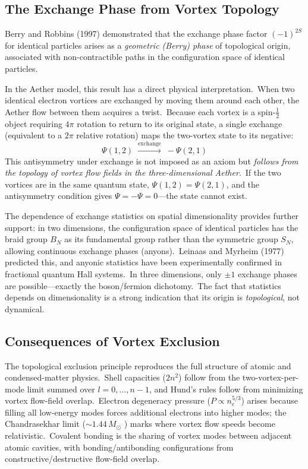 ﻿\documentclass[12pt,letterpaper]{article}
\begin{document}
\subsection{The Exchange Phase from Vortex Topology}

Berry and Robbins (1997) \cite{berry1997} demonstrated that the exchange phase
factor $(-1)^{2S}$ for identical particles arises as a \emph{geometric
(Berry) phase} of topological origin, associated with non-contractible paths in
the configuration space of identical particles.

In the Aether model, this result has a direct physical interpretation.\ When two
identical electron vortices are exchanged by moving them around each other, the
Aether flow between them acquires a twist.\ Because each vortex is a
spin-$\tfrac{1}{2}$ object requiring $4\pi$ rotation to return to its original
state, a single exchange (equivalent to a $2\pi$ relative rotation) maps the
two-vortex state to its negative:
%
\begin{equation}
  \Psi(1,2) \;\xrightarrow{\text{exchange}}\; -\Psi(2,1)
\end{equation}
%
This antisymmetry under exchange is not imposed as an axiom but \emph{follows
from the topology of vortex flow fields in the three-dimensional Aether}.\ If
the two vortices are in the same quantum state, $\Psi(1,2) = \Psi(2,1)$, and
the antisymmetry condition gives $\Psi = -\Psi = 0$---the state cannot exist.

The dependence of exchange statistics on spatial dimensionality provides further
support: in two dimensions, the configuration space of identical particles has the
braid group $B_N$ as its fundamental group rather than the symmetric group $S_N$,
allowing continuous exchange phases (anyons).\ Leinaas and Myrheim (1977)
\cite{leinaas1977} predicted this, and anyonic statistics have been experimentally
confirmed in fractional quantum Hall systems.\ In three dimensions, only $\pm 1$
exchange phases are possible---exactly the boson/fermion dichotomy.\ The fact that
statistics depends on dimensionality is a strong indication that its origin is
\emph{topological}, not dynamical.

\subsection{Consequences of Vortex Exclusion}

The topological exclusion principle reproduces the full structure of atomic
and condensed-matter physics.\ Shell capacities ($2n^2$) follow from the
two-vortex-per-mode limit summed over $l = 0, \ldots, n{-}1$, and Hund's
rules follow from minimizing vortex flow-field overlap.\ Electron
degeneracy pressure ($P \propto n_e^{5/3}$) arises because filling all
low-energy modes forces additional electrons into higher modes; the
Chandrasekhar limit ($\sim\!1.44\,M_\odot$ \cite{chandrasekhar1931}) marks
where vortex flow speeds become relativistic.\ Covalent bonding is the
sharing of vortex modes between adjacent atomic cavities, with
bonding/antibonding configurations from constructive/destructive
flow-field overlap.
\end{document}
